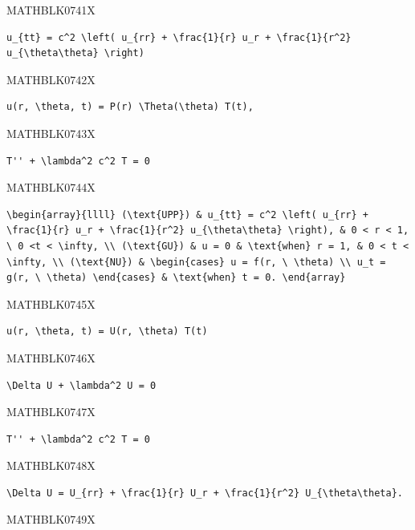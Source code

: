 \documentclass[
  ukrainian,
]{article}
\begin{document}
MATHBLK0741X

\begin{verbatim}
u_{tt} = c^2 \left( u_{rr} + \frac{1}{r} u_r + \frac{1}{r^2} u_{\theta\theta} \right)
\end{verbatim}

MATHBLK0742X

\begin{verbatim}
u(r, \theta, t) = P(r) \Theta(\theta) T(t),
\end{verbatim}

MATHBLK0743X

\begin{verbatim}
T'' + \lambda^2 c^2 T = 0
\end{verbatim}

MATHBLK0744X

\begin{verbatim}
\begin{array}{llll} (\text{UPP}) & u_{tt} = c^2 \left( u_{rr} + \frac{1}{r} u_r + \frac{1}{r^2} u_{\theta\theta} \right), & 0 < r < 1, \ 0 <t < \infty, \\ (\text{GU}) & u = 0 & \text{when} r = 1, & 0 < t < \infty, \\ (\text{NU}) & \begin{cases} u = f(r, \ \theta) \\ u_t = g(r, \ \theta) \end{cases} & \text{when} t = 0. \end{array}
\end{verbatim}

MATHBLK0745X

\begin{verbatim}
u(r, \theta, t) = U(r, \theta) T(t)
\end{verbatim}

MATHBLK0746X

\begin{verbatim}
\Delta U + \lambda^2 U = 0
\end{verbatim}

MATHBLK0747X

\begin{verbatim}
T'' + \lambda^2 c^2 T = 0
\end{verbatim}

MATHBLK0748X

\begin{verbatim}
\Delta U = U_{rr} + \frac{1}{r} U_r + \frac{1}{r^2} U_{\theta\theta}.
\end{verbatim}

MATHBLK0749X
\end{document}
